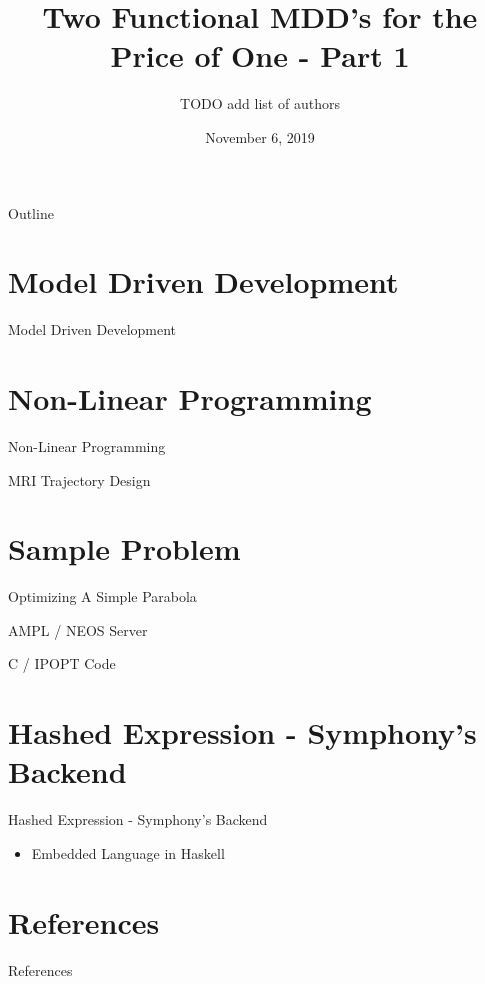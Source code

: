 \documentclass[presentation]{beamer}
\author{TODO add list of authors}
\date{November 6, 2019}
\title{Two Functional MDD's for the Price of One - Part 1}
\begin{document}
\maketitle
\begin{frame}{Outline}
\tableofcontents
\end{frame}


\section{Model Driven Development}
\label{sec:orgf064032}
\begin{frame}[label={sec:org9c2735a}]{Model Driven Development}
\end{frame}
\section{Non-Linear Programming}
\label{sec:org49ebdff}
\begin{frame}[label={sec:orgd027c63}]{Non-Linear Programming}
\end{frame}
\begin{frame}[label={sec:org4debd30}]{MRI Trajectory Design}
\end{frame}
\section{Sample Problem}
\label{sec:org6765f95}
\begin{frame}[label={sec:org0a594b7}]{Optimizing A Simple Parabola}
\end{frame}
\begin{frame}[label={sec:orgb450ab6}]{AMPL / NEOS Server}
\end{frame}
\begin{frame}[label={sec:org07fda49}]{C / IPOPT Code}
\end{frame}
\section{Hashed Expression - Symphony's Backend}
\label{sec:orga3e3bfb}
\begin{frame}[label={sec:org3131e28}]{Hashed Expression - Symphony's Backend}
\begin{itemize}
\item Embedded Language in \alert{Haskell}
\end{itemize}
\end{frame}
\section{References}
\label{sec:org51a8b04}
\begin{frame}[label={sec:org2b02857}]{References}
\printbibliography[heading=none]
\end{frame}
\end{document}
